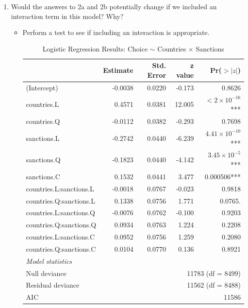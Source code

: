 \documentclass[12pt,letterpaper]{article}
\begin{document}
\begin{enumerate}
\begin{enumerate}
	\end{enumerate}
	\item
	Would the answers to 2a and 2b potentially change if we included an interaction term in this model? Why? 
	\begin{itemize}
		\item Perform a test to see if including an interaction is appropriate.
			 
				\vspace{10cm}
			\begin{table}[htbp]
				\centering
				\caption{Logistic Regression Results: Choice $\sim$ Countries $\times$ Sanctions}
				\begin{tabular}{lrrrr}
					\toprule
					& Estimate & Std. Error & z value & Pr($>|z|$) \\
					\midrule
					(Intercept) & -0.0038 & 0.0220 & -0.173 & 0.8626 \\
					
					countries.L & 0.4571 & 0.0381 & 12.005 & $< 2\times10^{-16}$*** \\
					countries.Q & -0.0112 & 0.0382 & -0.293 & 0.7698 \\
					
					sanctions.L & -0.2742 & 0.0440 & -6.239 & $4.41\times10^{-10}$*** \\
					sanctions.Q & -0.1823 & 0.0440 & -4.142 & $3.45\times10^{-5}$*** \\
					sanctions.C & 0.1532 & 0.0441 & 3.477 & 0.000506*** \\
					
					countries.L:sanctions.L & -0.0018 & 0.0767 & -0.023 & 0.9818 \\
					countries.Q:sanctions.L & 0.1338 & 0.0756 & 1.771 & 0.0765. \\
					countries.L:sanctions.Q & -0.0076 & 0.0762 & -0.100 & 0.9203 \\
					countries.Q:sanctions.Q & 0.0934 & 0.0763 & 1.224 & 0.2208 \\
					countries.L:sanctions.C & 0.0952 & 0.0756 & 1.259 & 0.2080 \\
					countries.Q:sanctions.C & 0.0104 & 0.0770 & 0.136 & 0.8921 \\
					\midrule
					\multicolumn{5}{l}{\textit{Model statistics}} \\
					Null deviance & \multicolumn{4}{r}{11783 (df = 8499)} \\
					Residual deviance & \multicolumn{4}{r}{11562 (df = 8488)} \\
					AIC & \multicolumn{4}{r}{11586} \\
					\bottomrule
				\end{tabular}
				

\end{table}
\end{itemize}
\end{enumerate}
\end{document}
